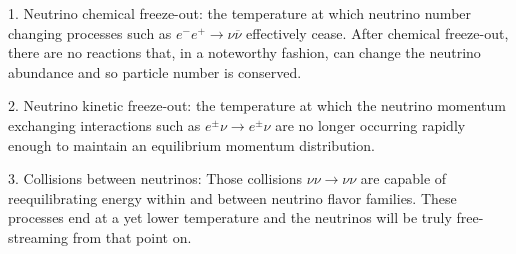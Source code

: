 
1. Neutrino chemical freeze-out: the temperature at which neutrino number changing processes such as $e^-e^+\to\nu\overline\nu$ effectively cease. After chemical freeze-out, there are no reactions that, in a noteworthy fashion, can
change the neutrino abundance and so particle number is conserved. %

2. Neutrino kinetic freeze-out: the temperature at which the neutrino momentum exchanging interactions such as $e^\pm\nu\to e^\pm\nu$ are no longer occurring rapidly enough to maintain an equilibrium momentum distribution. %

3. Collisions between neutrinos:
Those collisions $\nu\nu\to\nu\nu$ are capable of reequilibrating energy within and between neutrino flavor families. These processes end at a yet lower temperature and the neutrinos will be truly free-streaming from that point on.
 






